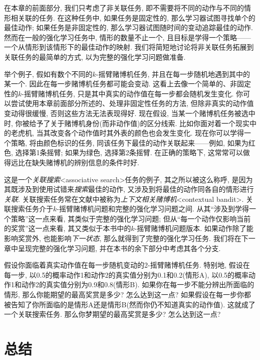 在本章的前面部分, 我们只考虑了非关联任务, 即不需要将不同的动作与不同的情形相关联的任务. 在这种任务中, 如果任务是固定性的, 那么学习器试图寻找单个的最佳动作; 如果任务是非固定性的, 那么学习器试图随时间的变动追踪最佳的动作. 然而在一般的强化学习任务中, 情形的数量不止一个, 且目标是学得一个策略——一个从情形到该情形下的最佳动作的映射. 我们将简短地讨论将非关联任务拓展到关联任务的最简单的方式, 以为完整的强化学习问题做准备.

举个例子, 假如有数个不同的$k$-摇臂赌博机任务, 并且在每一步随机地遇到其中的某一个. 因此在每一步赌博机任务都可能会变动. 这看上去像一个简单的、非固定性的$k$-摇臂赌博机任务, 只是其中真实的动作值在每一步都会随机发生变化. 你可以尝试使用本章前面部分所述的、处理非固定性任务的方法, 但除非真实的动作值变动得很缓慢, 否则这些方法无法表现得好. 现在假设, 当某一个赌博机任务被选中时, 你被给予了关于赌博机身份(而非动作值)的区分线索. 比如你面对着一个现实中的老虎机, 当其改变各个动作值时其外表的颜色也会发生变化. 现在你可以学得一个策略, 将由颜色标识的任务, 同该任务下最佳的动作关联起来——例如, 如果为红色, 选择第1条摇臂; 如果为绿色, 选择第2条摇臂. 在正确的策略下, 这常常可以做得远比在缺失赌博机的辨别信息的条件时好. 

这是一个\emph{关联搜索}<associative search>任务的例子, 其之所以被这么称呼, 是因为其既涉及到使用试错来\emph{搜索}最佳的动作, 又涉及到将最佳的动作同各自的情形进行\emph{关联}. 关联搜索任务常在文献中被称为\emph{上下文相关赌博机}<contextual bandit>. 关联搜索任务介于$k$-摇臂赌博机问题和完整的强化学习问题之间. 从其``涉及到学得一个策略''这一点来看, 其类似于完整的强化学习问题; 但从``每一个动作仅影响当前的奖赏''这一点来看, 其又类似于本书中的$k$-摇臂赌博机问题版本. 如果动作除了能影响奖赏外, 也能影响\emph{下一状态}, 那么就得到了完整的强化学习任务. 我们将在下一章中呈现完整的强化学习问题, 并在本书的余下部分中考虑其各个分支.

\begin{exer}
假设你面临着真实动作值在每一步随机变动的2-摇臂赌博机任务. 特别地, 假设在每一步, 以0.5的概率动作1和动作2的真实值分别为0.1和0.2(情形A), 以0.5的概率动作1和动作2的真实值分别为0.9和0.8(情形B). 如果你在每一步不能分辨出所面临的情形, 那么你能期望的最高奖赏是多少? 怎么达到这一点? 如果假设在每一步你都被告知了你所面临的是情形A还是情形B(然而你仍不知道真实的动作值). 这就成了一个关联搜索任务. 那么你梦期望的最高奖赏是多少? 怎么达到这一点?
\end{exer}

\section{总结}\label{sec:2.10}

